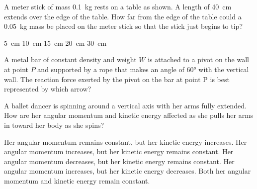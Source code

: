 \documentclass{../../oss-classkick-exam}
\begin{document}
\genheader


\genmultidirections

\gengravity

\raggedcolumns
\begin{multicols*}{2}
  \begin{questions}

    \question A meter stick of mass \SI{.1}{\kilo\gram} rests on a table as
    shown. A length of \SI{40}{\centi\metre} extends over the edge of the table.
    How far from the edge of the table could a \SI{.05}{\kilo\gram} mass be
    placed on the meter stick so that the stick just begins to tip?
    \begin{center}
    \end{center}
    \begin{choices}
      \choice\SI{5}{\centi\metre}
      \choice\SI{10}{\centi\metre}
      \choice\SI{15}{\centi\metre}
      \choice\SI{20}{\centi\metre}
      \choice\SI{30}{\centi\metre}
    \end{choices}
    
    \question A metal bar of constant density and weight $W$ is attached to a
    pivot on the wall at point $P$ and supported by a rope that makes an angle
    of \ang{60} with the vertical wall. The reaction force exerted by the pivot
    on the bar at point P is best represented by which arrow?
    \begin{choices}
      \choice{\Large $\nearrow$}
      \choice{\Large $\uparrow$}
      \choice{\Large $\downarrow$}
      \choice{\Large $\nwarrow$}
      \choice{\Large $\searrow$}
    \end{choices}

    \question A ballet dancer is spinning around a vertical axis with her arms
    fully extended. How are her angular momentum and kinetic energy affected
    as she pulls her arms in toward her body as she spins?
    \begin{choices}
      \choice Her angular momentum remains constant, but her kinetic energy
      increases.
      \choice Her angular momentum increases, but her kinetic energy remains
      constant.
      \choice Her angular momentum decreases, but her kinetic energy remains
      constant.
      \choice Her angular momentum increases, but her kinetic energy decreases.
      \choice Both her angular momentum and kinetic energy remain constant.
    \end{choices}
    \vspace{.7in}
    

\end{questions}
\end{multicols*}
\end{document}
